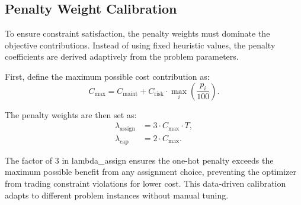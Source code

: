 \subsection{Penalty Weight Calibration}
To ensure constraint satisfaction, the penalty weights must dominate the objective contributions. Instead of using fixed heuristic values, the penalty coefficients are derived adaptively from the problem parameters.

First, define the maximum possible cost contribution as:
\begin{equation}
C_{\max} = C_{\text{maint}} + C_{\text{risk}} \cdot \max_{i} \left( \frac{p_i}{100} \right).
\end{equation}

The penalty weights are then set as:
\begin{align}
\lambda_{\text{assign}} &= 3 \cdot C_{\max} \cdot T, \\
\lambda_{\text{cap}}    &= 2 \cdot C_{\max}.
\end{align}

The factor of 3 in lambda_assign ensures the one-hot penalty exceeds the maximum possible benefit from any assignment choice, preventing the optimizer from trading constraint violations for lower cost. This data-driven calibration adapts to different problem instances without manual tuning.

